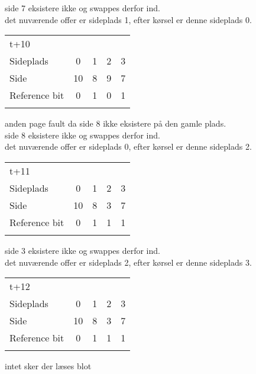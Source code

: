 \documentclass[titlepage]{article}
\begin{document}
side 7 eksistere ikke og swappes derfor ind.\\
det nuværende offer er sideplads 1, efter kørsel er denne sideplads 0.\\

\begin{tabular}{l | c | c | c | c}
t+10\\
Sideplads    & 0 & 1 & 2 & 3\\
Side         & 10 & 8 & 9 & 7\\
Reference bit & 0 & 1 & 0 & 1\\\\
\end{tabular}

anden page fault da side 8 ikke eksistere på den gamle plads.\\
side 8 eksistere ikke og swappes derfor ind.\\
det nuværende offer er sideplads 0, efter kørsel er denne sideplads 2.\\

\begin{tabular}{l | c | c | c | c}
t+11\\
Sideplads    & 0 & 1 & 2 & 3\\
Side         & 10 & 8 & 3 & 7\\
Reference bit & 0 & 1 & 1 & 1\\\\
\end{tabular}

side 3 eksistere ikke og swappes derfor ind.\\
det nuværende offer er sideplads 2, efter kørsel er denne sideplads 3.\\


\begin{tabular}{l | c | c | c | c}
t+12\\
Sideplads    & 0 & 1 & 2 & 3\\
Side         & 10 & 8 & 3 & 7\\
Reference bit & 0 & 1 & 1 & 1\\\\
\end{tabular}

intet sker der læses blot\\
\end{document}
